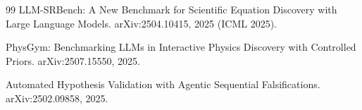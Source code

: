 \documentclass[11pt]{article}
\begin{document}
\begin{thebibliography}{99}
 LLM-SRBench: A New Benchmark for Scientific Equation Discovery with Large Language
Models.
\newblock arXiv:2504.10415, 2025 (ICML 2025).

 PhysGym: Benchmarking LLMs in Interactive Physics Discovery with Controlled Priors.
\newblock arXiv:2507.15550, 2025.

 Automated Hypothesis Validation with Agentic Sequential Falsifications.
\newblock arXiv:2502.09858, 2025.

\end{thebibliography}
\end{document}
